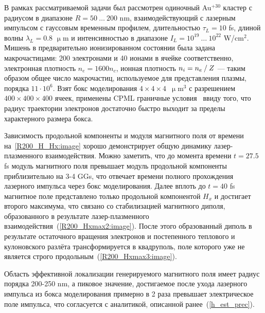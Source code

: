 В рамках рассматриваемой задачи был рассмотрен одиночный Au$^{+30}$ кластер с радиусом в диапазоне $R = 50\:\dots\:200$ nm, взаимодействующий с лазерным импульсом с гауссовым временным профилем, длительностью $\tau_L = 10$ fs, длиной волны $\lambda_L = 0.8$ $\upmu$m и интенсивностью в диапазоне $I_L = 10^{19}\:\dots\:10^{22}$ W/cm$^{2}$. Мишень в предварительно ионизированном состоянии была задана макрочастицами: 200 электронами и 40 ионами в ячейке соответственно, электронная плотность $n_e = 1600 n_c$, ионная плотность $n_i = {n_e}\:/\:{Z}$ --- таким образом общее число макрочастиц, используемое для представления плазмы, порядка $11 \cdot 10^6$. Взят бокс моделирования $4\times4\times4$~$\upmu$m$^3$ с разрешением $400\times400\times400$ ячеек, применены CPML граничные условия~\cite{cpml2000} ввиду того, что радиус траектории электронов достаточно быстро выходит за пределы характерного размера бокса.

Зависимость продольной компоненты и модуля магнитного поля от времени на~\autoref{R200_H_Hx:image} хорошо демонстрирует общую динамику лазер-плазменного взаимодействия. Можно заметить, что до момента времени $t = 27.5$ fs модуль магнитного поля превышает модуль продольной компоненты приблизительно на 3-4 GGs, что отвечает времени полного прохождения лазерного импульса через бокс моделирования. Далее вплоть до $t = 40$ fs магнитное поле представлено только продольной компонентой $H_x$ и достигает второго максимума, что связано со стабилизацией магнитного диполя, образованного в результате лазер-плазменного взаимодействия~(\autoref{R200_Hxmax2:image}). После этого образованный диполь в результате остаточного вращения электронов и постепенного теплового и кулоновского разлёта трансформируется в квадруполь, поле которого уже не является строго продольным~(\autoref{R200_Hxmax3:image}).  


Область эффективной локализации генерируемого магнитного поля имеет радиус порядка 200-250 nm, а пиковое значение, достигаемое после ухода лазерного импульса из бокса моделирования примерно в 2 раза превышает электрическое поле импульса, что согласуется с аналитикой, описанной ранее~(\ref{h_est_prec}).


